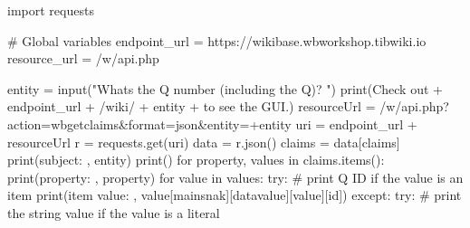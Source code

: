 \documentclass[
  letterpaper,
  DIV=11,
  numbers=noendperiod]{scrreprt}
\newenvironment{Shaded}{\begin{snugshade}}{\end{snugshade}}
\newcommand{\BuiltInTok}[1]{\textcolor[rgb]{0.00,0.23,0.31}{#1}}
\newcommand{\CommentTok}[1]{\textcolor[rgb]{0.37,0.37,0.37}{#1}}
\newcommand{\ControlFlowTok}[1]{\textcolor[rgb]{0.00,0.23,0.31}{#1}}
\newcommand{\ImportTok}[1]{\textcolor[rgb]{0.00,0.46,0.62}{#1}}
\newcommand{\KeywordTok}[1]{\textcolor[rgb]{0.00,0.23,0.31}{#1}}
\newcommand{\NormalTok}[1]{\textcolor[rgb]{0.00,0.23,0.31}{#1}}
\newcommand{\OperatorTok}[1]{\textcolor[rgb]{0.37,0.37,0.37}{#1}}
\newcommand{\StringTok}[1]{\textcolor[rgb]{0.13,0.47,0.30}{#1}}
\begin{document}
\begin{Shaded}
\begin{Highlighting}[]
\ImportTok{import}\NormalTok{ requests}

\CommentTok{\# Global variables}
\NormalTok{endpoint\_url }\OperatorTok{=} \StringTok{\textquotesingle{}https://wikibase.wbworkshop.tibwiki.io\textquotesingle{}}
\NormalTok{resource\_url }\OperatorTok{=} \StringTok{\textquotesingle{}/w/api.php\textquotesingle{}}

\NormalTok{entity }\OperatorTok{=} \BuiltInTok{input}\NormalTok{(}\StringTok{"What\textquotesingle{}s the Q number (including the \textquotesingle{}Q\textquotesingle{})? "}\NormalTok{)}
\BuiltInTok{print}\NormalTok{(}\StringTok{\textquotesingle{}Check out \textquotesingle{}} \OperatorTok{+}\NormalTok{ endpoint\_url }\OperatorTok{+} \StringTok{\textquotesingle{}/wiki/\textquotesingle{}} \OperatorTok{+}\NormalTok{ entity }\OperatorTok{+} \StringTok{\textquotesingle{} to see the GUI.\textquotesingle{}}\NormalTok{)}
\NormalTok{resourceUrl }\OperatorTok{=} \StringTok{\textquotesingle{}/w/api.php?action=wbgetclaims\&format=json\&entity=\textquotesingle{}}\OperatorTok{+}\NormalTok{entity}
\NormalTok{uri }\OperatorTok{=}\NormalTok{ endpoint\_url }\OperatorTok{+}\NormalTok{ resourceUrl}
\NormalTok{r }\OperatorTok{=}\NormalTok{ requests.get(uri)}
\NormalTok{data }\OperatorTok{=}\NormalTok{ r.json()}
\NormalTok{claims }\OperatorTok{=}\NormalTok{ data[}\StringTok{\textquotesingle{}claims\textquotesingle{}}\NormalTok{]}
\BuiltInTok{print}\NormalTok{(}\StringTok{\textquotesingle{}subject: \textquotesingle{}}\NormalTok{, entity)}
\BuiltInTok{print}\NormalTok{()}
\ControlFlowTok{for} \BuiltInTok{property}\NormalTok{, values }\KeywordTok{in}\NormalTok{ claims.items():}
    \BuiltInTok{print}\NormalTok{(}\StringTok{\textquotesingle{}property: \textquotesingle{}}\NormalTok{, }\BuiltInTok{property}\NormalTok{)}
    \ControlFlowTok{for}\NormalTok{ value }\KeywordTok{in}\NormalTok{ values:}
        \ControlFlowTok{try}\NormalTok{:}
            \CommentTok{\# print Q ID if the value is an item}
            \BuiltInTok{print}\NormalTok{(}\StringTok{\textquotesingle{}item value: \textquotesingle{}}\NormalTok{, value[}\StringTok{\textquotesingle{}mainsnak\textquotesingle{}}\NormalTok{][}\StringTok{\textquotesingle{}datavalue\textquotesingle{}}\NormalTok{][}\StringTok{\textquotesingle{}value\textquotesingle{}}\NormalTok{][}\StringTok{\textquotesingle{}id\textquotesingle{}}\NormalTok{])}
        \ControlFlowTok{except}\NormalTok{:}
            \ControlFlowTok{try}\NormalTok{:}
                \CommentTok{\# print the string value if the value is a literal}

\end{Highlighting}
\end{Shaded}
\end{document}
